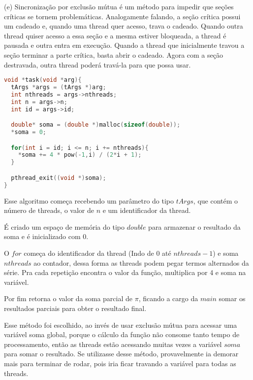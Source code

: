\documentclass{homework}
\begin{document}
(e) Sincronização por exclusão mútua é um método para impedir que seções críticas se tornem problemáticas. Analogamente falando, a seção crítica possui um cadeado e, quando uma thread quer acesso, trava o cadeado. Quando outra thread quiser acesso a essa seção e a mesma estiver bloqueada, a thread é pausada e outra entra em execução. Quando a thread que inicialmente travou a seção terminar a parte crítica, basta abrir o cadeado. Agora com a seção destravada, outra thread poderá travá-la para que possa usar.

\exercise* 
\begin{lstlisting}[language=C]
void *task(void *arg){
  tArgs *args = (tArgs *)arg;
  int nthreads = args->nthreads;
  int n = args->n;
  int id = args->id;

  double* soma = (double *)malloc(sizeof(double));
  *soma = 0;

  for(int i = id; i <= n; i += nthreads){
    *soma += 4 * pow(-1,i) / (2*i + 1);
  }

  pthread_exit((void *)soma);
}
\end{lstlisting}

Esse algoritmo começa recebendo um parâmetro do tipo $tArgs$, que contém o número de threads, o valor de $n$ e um identificador da thread.

É criado um espaço de memória do tipo $double$ para armazenar o resultado da soma e é inicializado com 0.

O $for$ começa do identificador da thread (Indo de 0 até $nthreads - 1$) e soma $nthreads$ ao contador, dessa forma as threads podem pegar termos alternados da série. Pra cada repetição encontra o valor da função, multiplica por 4 e soma na variável.

Por fim retorna o valor da soma parcial de $\pi$, ficando a cargo da $main$ somar os resultados parciais para obter o resultado final.

Esse método foi escolhido, ao invés de usar exclusão mútua para acessar uma variável soma global, porque o cálculo da função não consome tanto tempo de processamento, então as threads estão acessando muitas vezes a variável $soma$ para somar o resultado. Se utilizasse desse método, provavelmente ia demorar mais para terminar de rodar, pois iria ficar travando a variável para todas as threads.
\end{document}
